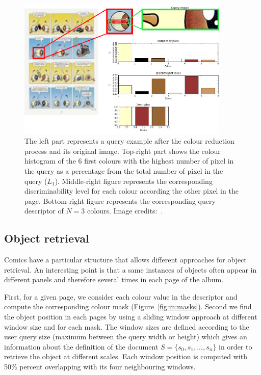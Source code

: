  \begin{figure}[!ht]	%
 	 \centering
 	\includegraphics[width=0.9\textwidth]{description_sequence.png}
 	\caption[Comic character query description]{The left part represents a query example after the colour reduction process and its original image. Top-right part shows the colour histogram of the 6 first colours with the highest number of pixel in the query as a percentage from the total number of pixel in the query ($L_1$). Middle-right figure represents the corresponding discriminability level for each colour according the other pixel in the page. Bottom-right figure represents the corresponding query descriptor of $N=3$ colours. Image credits:~\cite{Noeils11}. }
 	\label{fig:in:dominant_colour_hist_desc}
 \end{figure}


\subsection{Object retrieval}
Comics have a particular structure that allows different approaches for object retrieval. An interesting point is that a same instances of objects often appear in different panels and therefore several times in each page of the album.

First, for a given page, we consider each colour value in the descriptor and compute the corresponding colour mask (Figure~\ref{fig:in:masks}). %
Second we find the object position in each pages by using a sliding window approach at different window size and for each mask.
The window sizes are defined according to the user query size (maximum between the query width or height) which gives an information about the definition of the document $S=\{s_0,s_1,...,s_n\}$ in order to retrieve the object at different scales.
Each window position is computed with 50\% percent overlapping with its four neighbouring windows.

